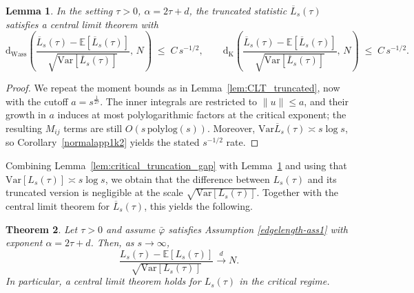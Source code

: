 \documentclass{article}
\newtheorem{theorem}{Theorem}[section]
\newtheorem{lemma}[theorem]{Lemma}
\theoremstyle{definition}
\numberwithin{equation}{section}
\theoremstyle{remark}
\newcommand{\E}{\mathbb{E}}
\newcommand{\Var}{\mathrm{Var}}
\begin{document}
\begin{lemma}\label{lem:critical_truncated_CLT}
In the setting $\tau>0$, $\alpha=2\tau+d$, the truncated statistic $\overline{L}_s(\tau)$
satisfies a central limit theorem with
\[
\mathrm{d}_{\mathrm{Wass}}\!\left(
\frac{\overline{L}_s(\tau)-\E[\overline{L}_s(\tau)]}{\sqrt{\Var [\overline{L}_s(\tau)]}},\,N\right)
\;\le\; C\,s^{-1/2},
\qquad
\mathrm{d}_{\mathrm{K}}\!\left(
\frac{\overline{L}_s(\tau)-\E[\overline{L}_s(\tau)]}{\sqrt{\Var[\overline{L}_s(\tau)]}},\,N\right)
\;\le\; C\,s^{-1/2}.
\]
\end{lemma}

\begin{proof}
We repeat the moment bounds as in Lemma~\ref{lem:CLT_truncated}, now with the cutoff
$a=s^{\frac{1}{2\tau}}$. The inner integrals are restricted to $\|u\|\le a$, and their growth
in $a$ induces at most polylogarithmic factors at the critical exponent;
the resulting $M_{ij}$ terms are still $O(s\,\mathrm{polylog}(s))$.
Moreover, $\Var\overline{L}_s(\tau)\asymp s\log s$, so Corollary~\ref{normalapp1k2}
yields the stated $s^{-1/2}$ rate.
\end{proof}




Combining Lemma~\ref{lem:critical_truncation_gap} with Lemma~\ref{lem:critical_truncated_CLT}
and using that $\Var[L_s(\tau)] \asymp s\log s$, we obtain that the difference between
$L_s(\tau)$ and its truncated version is negligible at the scale $\sqrt{\Var[L_s(\tau)]}$.
Together with the central limit theorem for $\overline{L}_s(\tau)$, this yields the following.

\begin{theorem}\label{thm:CLTedgelengths_critical_full}
Let $\tau>0$ and assume $\bar{\varphi}$ satisfies Assumption \ref{edgelength-ass1} with exponent
$\alpha=2\tau+d$. Then, as $s\to\infty$,
\[
\frac{L_s(\tau)-\E[L_s(\tau)]}{\sqrt{\Var[L_s(\tau)]}}
\overset{d}{\longrightarrow}
N.
\]
In particular, a central limit theorem holds for $L_s(\tau)$ in the critical regime.
\end{theorem}







\end{document}
